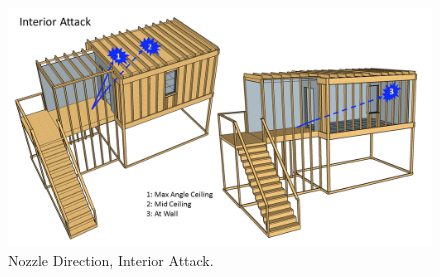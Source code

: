 \documentclass[12pt,oneside]{book}
\begin{document}
\begin{figure}[!ht]
	\centering
	\includegraphics[width=\columnwidth]{Figures/Water_Distribution/Nozzle_Position_Int}
	\caption[Nozzle Direction, Interior Attack]{Nozzle Direction, Interior Attack.}
	\label{fig:Nozzle_Direction_Interior_Attack}
\end{figure}
\end{document}
